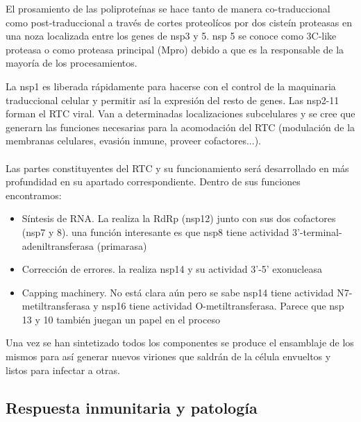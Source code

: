 \documentclass[a4paper,11pt]{report}
\begin{document}
El prosamiento de las poliproteínas se hace tanto de manera co-traduccional como post-traduccional a través de cortes proteolícos por dos cisteín proteasas en una noza localizada entre los genes de nsp3 y 5. nsp 5 se conoce como 3C-like proteasa o como proteasa principal (Mpro) debido a que es la responsable de la mayoría de los procesamientos. 

La nsp1 es liberada rápidamente para hacerse con el control de la maquinaria traduccional celular y permitir así la expresión del resto de genes. Las nsp2-11 forman el RTC viral. Van a determinadas localizaciones subcelulares y se cree que generarn las funciones necesarias para la acomodación del RTC (modulación de la membranas celulares, evasión inmune, proveer cofactores...). \cite{ciclo}\\\\

Las partes constituyentes del RTC y su funcionamiento será desarrollado en más profundidad en su apartado correspondiente. Dentro de sus funciones encontramos:

\begin{itemize}
	\item Síntesis de RNA. La realiza la RdRp (nsp12) junto con sus dos cofactores (nsp7 y 8). una función interesante es que nsp8 tiene actividad 3'-terminal-adeniltransferasa (primarasa)
	\item Corrección de errores. la realiza nsp14 y su actividad 3'-5' exonucleasa 
	\item Capping machinery. No está clara aún pero se sabe nsp14 tiene actividad N7-metiltransferasa y nsp16 tiene actividad O-metiltransferasa. Parece que nsp 13 y 10 también juegan un papel en el proceso
\end{itemize}

Una vez se han sintetizado todos los componentes se produce el ensamblaje de los mismos para así generar nuevos viriones que saldrán de la célula envueltos y listos para infectar a otras.
  
 \subsection{Respuesta inmunitaria y patología}
 
\end{document}
